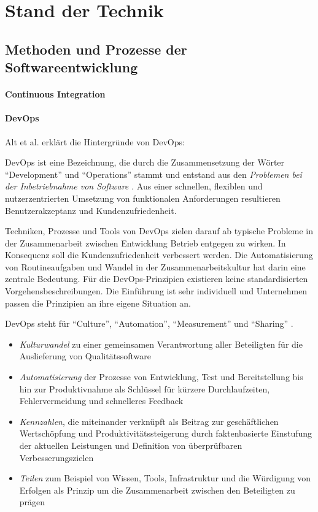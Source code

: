 \section{Stand der Technik}

\subsection{Methoden und Prozesse der Softwareentwicklung}

\paragraph{Continuous Integration}

\paragraph{DevOps}
Alt et al. erklärt die Hintergründe von DevOps:

DevOps ist eine Bezeichnung, die durch die Zusammensetzung der Wörter \enquote{Development} und \enquote{Operations} stammt und entstand aus den \emph{Problemen bei der Inbetriebnahme von Software \cite{mci/Disterer2011}}.
Aus einer schnellen, flexiblen und nutzerzentrierten Umsetzung von funktionalen Anforderungen resultieren Benutzerakzeptanz und Kundenzufriedenheit. 

Techniken, Prozesse und Tools von DevOps zielen darauf ab typische Probleme in der Zusammenarbeit zwischen Entwicklung Betrieb entgegen zu wirken. In Konsequenz soll die Kundenzufriedenheit verbessert werden. Die Automatisierung von Routineaufgaben und Wandel in der Zusammenarbeitskultur hat darin eine zentrale Bedeutung. Für die DevOps-Prinzipien existieren keine standardisierten Vorgehensbeschreibungen. Die Einführung ist sehr individuell und Unternehmen passen die Prinzipien an ihre eigene Situation an. 

DevOps steht für \enquote{Culture}, \enquote{Automation}, \enquote{Measurement} und \enquote{Sharing} \cite{humble:2011}. 
\begin{itemize}
    \item \emph{Kulturwandel} zu einer gemeinsamen Verantwortung aller Beteiligten für die Auslieferung von Qualitätssoftware
    \item \emph{Automatisierung} der Prozesse von Entwicklung, Test und Bereitstellung bis hin zur Produktivnahme als Schlüssel für kürzere Durchlaufzeiten, Fehlervermeidung und schnelleres Feedback
    \item \emph{Kennzahlen}, die miteinander verknüpft als Beitrag zur geschäftlichen Wertschöpfung und Produktivitätssteigerung durch faktenbasierte Einstufung der aktuellen Leistungen und Definition von überprüfbaren Verbesserungszielen
    \item \emph{Teilen} zum Beispiel von Wissen, Tools, Infrastruktur und die Würdigung von Erfolgen als Prinzip um die Zusammenarbeit zwischen den Beteiligten zu prägen
\end{itemize}

